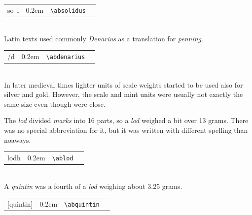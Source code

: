 \documentclass[a4paper]{article}
\newcommand{\samplefont}{\fontsize{16}{16}\abcursivefamily\spaceskip0.2em}
\newcommand{\sample}[1]{{\samplefont #1 \strut}}
\newcommand{\ltxncmd}[1]{\texttt{\textbackslash{}#1}}
\begin{document}
\begin{description}
  \begin{center}
    \begin{tabular}{llll}
      {}so~l  & \sample{\absolidus} & \ltxncmd{absolidus} \\
    \end{tabular}
  \end{center}



\item[\sample{\abdenarius} Denarius] \mbox{}\\
  Latin texts used commonly \emph{Denarius} as a translation for
  \emph{penning}.

  \begin{center}
    \begin{tabular}{llll}
      {}/d  & \sample{\abdenarius} & \ltxncmd{abdenarius} \\
    \end{tabular}
  \end{center}


\item[\sample{lodh} \emph{Lod}, \emph{luoti}] \mbox{} \\
  In later medieval times lighter units of scale weights started to be
  used also for silver and gold. However, the scale and mint units
  were usually not exactly the same size even though were close.

  The \emph{lod} divided \emph{marks} into 16 parts, so a \emph{lod}
  weighed a bit over 13 grams. There was no special abbreviation for
  it, but it was written with different spelling than noaways. 

  \begin{center}
    \begin{tabular}{llll}
      {}lodh  & \sample{\ablod} & \ltxncmd{ablod} \\
    \end{tabular}
  \end{center}


\item[\sample{\abquintin} \emph{Quintin},
  \emph{kvintiini}] \mbox{} \\
  A \emph{quintin} was a fourth of a \emph{lod} weighing about 3.25
  grams. 
  \begin{center}
    \begin{tabular}{llll}
      {}[quintin]  & \sample{\abquintin} & \ltxncmd{abquintin} \\
    \end{tabular}
  \end{center}


\end{description}
\end{document}
